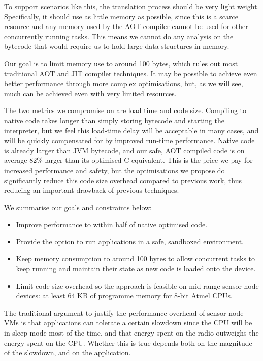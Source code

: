To support scenarios like this, the translation process should be very light weight. Specifically, it should use as little memory as possible, since this is a scarce resource and any memory used by the AOT compiler cannot be used for other concurrently running tasks. This means we cannot do any analysis on the bytecode that would require us to hold large data structures in memory.

Our goal is to limit memory use to around 100 bytes, which rules out most traditional AOT and JIT compiler techniques. It may be possible to achieve even better performance through more complex optimisations, but, as we will see, much can be achieved even with very limited resources.

The two metrics we compromise on are load time and code size. Compiling to native code takes longer than simply storing bytecode and starting the interpreter, but we feel this load-time delay will be acceptable in many cases, and will be quickly compensated for by improved run-time performance. Native code is already larger than JVM bytecode, and our safe, AOT compiled code is on average 82\% larger than its optimised C equivalent. This is the price we pay for increased performance and safety, but the optimisations we propose do significantly reduce this code size overhead compared to previous work, thus reducing an important drawback of previous techniques.

We summarise our goals and constraints below:
\begin{itemize}
  \item Improve performance to within half of native optimised code.
  \item Provide the option to run applications in a safe, sandboxed environment.
  \item Keep memory consumption to around 100 bytes to allow concurrent tasks to keep running and maintain their state as new code is loaded onto the device.
  \item Limit code size overhead so the approach is feasible on mid-range sensor node devices: at least 64 KB of programme memory for 8-bit Atmel CPUs.
\end{itemize}

The traditional argument to justify the performance overhead of sensor node VMs is that applications can tolerate a certain slowdown since the CPU will be in sleep mode most of the time, and that energy spent on the radio outweighs the energy spent on the CPU. Whether this is true depends both on the magnitude of the slowdown, and on the application.

